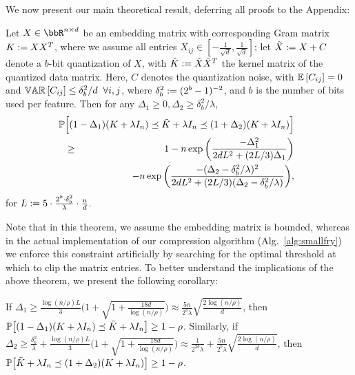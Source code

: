 We now present our main theoretical result, deferring all proofs to the Appendix:
\begin{theorem}
	\label{thm:main}
	Let $X \in \RR^{n\times d}$ be an embedding matrix with corresponding Gram matrix $K \defeq XX^T$, where we assume all entries $X_{ij} \in [-\frac{1}{\sqrt{d}},\frac{1}{\sqrt{d}}]$; let $\tX\defeq X+C$ denote a $b$-bit quantization of $X$, with $\tK \defeq \tX\tX^T$ the kernel matrix of the quantized data matrix. Here, $C$ denotes the quantization noise, with $\expect{}{C_{ij}} = 0$ and $\var{}{C_{ij}} \leq \delta_b^2/d \;\;\forall i,j$, where $\delta_b^2 \defeq (2^b-1)^{-2}$, and $b$ is the number of bits used per feature.
	Then for any $\Delta_1 \geq 0, \Delta_2 \geq \delta^2_b/\lambda$,
	\begin{eqnarray*}
	&&\hspace{-0.37in}\Prob\Big[(1- \Delta_1) (K + \lambda I_n) \preceq \tK + \lambda I_n \preceq (1 + \Delta_2) (K + \lambda I_n)
	\Big] 
	\\ &\geq& 1 - 
	n \exp \bigg(\frac{-\Delta_1^2}{2dL^2 + (2L/3)\Delta_1}\bigg) \\
	&&- n \exp \bigg(\frac{-(\Delta_2-\delta_b^2/\lambda)^2}{2dL^2 + (2L/3)(\Delta_2-\delta_b^2/\lambda)}\bigg),
	\end{eqnarray*}
	for $L \defeq 5 \cdot \frac{2^b \cdot \delta_b^2}{\lambda}\cdot \frac{n}{d}$.
\end{theorem}
Note that in this theorem, we assume the embedding matrix is bounded, whereas in the actual implementation of our compression algorithm (Alg.~\ref{alg:smallfry}) we enforce this constraint artificially by searching for the optimal threshold at which to clip the matrix entries.
To better understand the implications of the above theorem, we present the following corollary:
\begin{corollary}
	\label{cor:main}
	If $\Delta_1 \geq \frac{\log(n/\rho)L}{3}\Big(1+\sqrt{1+\frac{18d}{\log(n/\rho)}}\Big) \approx \frac{5n}{2^b \lambda}\sqrt{\frac{2\log(n/\rho)}{d}}$,
	then $\Prob\big[(1 - \Delta_1) (K + \lambda I_n) \preceq \tK + \lambda I_n \big] \geq  1 - \rho$. 
	Similarly, if $\Delta_2 \geq \frac{\delta_b^2}{\lambda} +  \frac{\log(n/\rho)L}{3}\Big(1+\sqrt{1+\frac{18d}{\log(n/\rho)}}\Big) \approx \frac{1}{2^{2b}\lambda} + \frac{5n}{2^b \lambda}\sqrt{\frac{2\log(n/\rho)}{d}}$,
	then $\Prob\big[\tK + \lambda I_n \preceq (1 + \Delta_2) (K + \lambda I_n)\big] \geq  1 - \rho$. 
\end{corollary}

